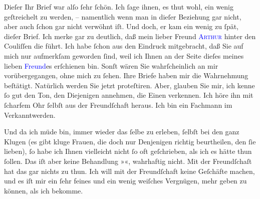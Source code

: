 \pstart
           Dieſer Ihr Brief war alſo ſehr ſchön. Ich ſage ihnen, es thut wohl, ein wenig
               geſtreichelt zu werden, – namentlich wenn man in dieſer Beziehung gar nicht, aber
               auch ſchon gar nicht verwöhnt iſt. Und doch, er kam ein wenig zu ſpät, dieſer Brief.
               Ich merke gar zu deutlich, daß mein lieber Freund \textsc{\textcolor{blue}{Arthur}{}\ledrightnote{}} hinter den Couliſſen die \label{K_L03524-1v}\label{K_L03524-1h} führt. Ich habe ſchon aus \label{T_L03524-1v}\label{T_L03524-1h}{ }{\pb}den Eindruck mitgebracht, \strikeout{\textcolor{gray}{×}\-\textcolor{gray}{×}\-\textcolor{gray}{×}} daß Sie auf mich nur aufmerkſam geworden ſind, weil ich Ihnen an der Seite
               dieſes meines lieben \textcolor{blue}{Freund}{}\ledrightnote{{$\rightarrow$}}es
               erſchienen bin. Sonſt wären Sie wahrſcheinlich an mir vorübergegangen, ohne mich zu
               ſehen. Ihre Briefe haben mir die Wahrnehmung beſtätigt. Natürlich werden Sie jetzt
               proteſtiren. Aber, glauben Sie mir, ich kenne ſo gut den Ton, den Diejenigen
               annehmen, die Einen verkennen. Ich höre ihn mit ſcharfem Ohr ſelbſt aus der
               Freundſchaft heraus. Ich bin ein Fachmann im Verkanntwerden.\pend
           
\pstart
           Und da ich müde bin, immer wieder das ſelbe zu erleben, ſelbſt bei den ganz Klugen
               (es gibt kluge Frauen, die doch {\pb}nur Denjenigen
               richtig beurtheilen, den ſie lieben), ſo habe ich Ihnen vielleicht nicht ſo oft
               geſchrieben, als ich es hätte thun ſollen. Das iſt aber keine Behandlung »\label{K_L03524-2v}\label{K_L03524-2h}«,
               wahrhaftig nicht. Mit der Freundſchaſt hat das gar nichts zu thun. Ich will mit der
               Freundſchaft keine Geſchäfte machen, und es iſt mir ein ſehr feines und ein wenig
               weiſches Vergnügen, mehr geben zu können, als ich bekomme.\pend
           
